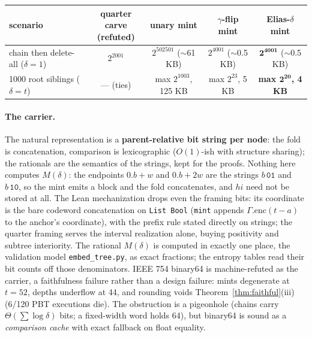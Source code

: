 \documentclass[11pt]{article}
\newcommand{\code}[1]{\texttt{#1}}
\begin{document}
\begin{center}\small
\setlength{\tabcolsep}{4.5pt}
\begin{tabular}{@{}lcccc@{}}
\toprule
scenario & \shortstack[c]{quarter carve\\ (refuted)} &
  unary mint & $\gamma$-flip mint & \textbf{Elias-$\delta$ mint} \\
\midrule
chain then delete-all ($\delta{=}1$) & $2^{2001}$ &
  $2^{502501}$ ($\sim$61 KB) & $2^{4001}$ ($\sim$0.5 KB) &
  $\boldsymbol{2^{4001}}$ ($\sim$0.5 KB) \\
1000 root siblings ($\delta{=}t$) & --- (ties) &
  max $2^{1003}$, 125 KB & max $2^{23}$, 5 KB &
  \textbf{max $\boldsymbol{2^{20}}$, 4 KB} \\
\bottomrule
\end{tabular}
\end{center}

\paragraph{The carrier.} The natural representation is a
\textbf{parent-relative bit string per node}: the fold is
concatenation, comparison is lexicographic ($O(1)$-ish with
structure sharing); the rationals are the semantics of the strings,
kept for the proofs. Nothing here computes $M(\delta)$: the
endpoints $0.b + w$ and $0.b + 2w$ are the strings $b\,\code{01}$
and $b\,\code{10}$, so the mint emits a block and the fold
concatenates, and $hi$ need not be stored at all. The Lean
mechanization drops even the framing bits: its coordinate is the
bare codeword concatenation on \code{List Bool} (\code{mint} appends
$\Gamma.\mathrm{enc}(t - a)$ to the anchor's coordinate), with the
prefix rule stated directly on strings; the quarter framing serves
the interval realization alone, buying positivity and subtree
interiority. The rational $M(\delta)$ is computed in exactly one
place, the validation model \code{embed\_tree.py}, as exact
fractions; the entropy tables read their bit counts off those
denominators. IEEE 754 binary64 is machine-refuted as the
carrier, a faithfulness failure rather than a design failure: mints
degenerate at $t = 52$, depths underflow at 44, and rounding voids
Theorem~\ref{thm:faithful}(iii) (6/120 PBT executions die). The
obstruction is a pigeonhole (chains carry $\Theta(\sum \log
\delta)$ bits; a fixed-width word holds 64), but binary64 is sound
as a \emph{comparison cache} with exact fallback on float equality.
\end{document}
